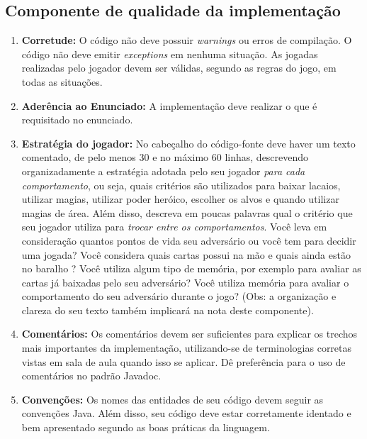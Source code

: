 \documentclass[10pt]{article}
\begin{document}
\subsection{Componente de qualidade da implementação} \label{ssec:componentes}

\begin{enumerate}
    \item \textbf{Corretude:} O código não deve possuir \textit{warnings} ou erros de compilação. O código não deve emitir \textit{exceptions} em nenhuma situação. As jogadas realizadas pelo jogador devem ser válidas, segundo as regras do jogo, em todas as situações.
    \item \textbf{Aderência ao Enunciado:} A implementação deve realizar o que é requisitado no enunciado.
    \item \textbf{Estratégia do jogador:} No cabeçalho do código-fonte deve haver um texto comentado, de pelo menos 30 e no máximo 60 linhas, descrevendo organizadamente a estratégia adotada pelo seu jogador \textit{para cada comportamento}, ou seja, quais critérios são utilizados para baixar lacaios, utilizar magias, utilizar poder heróico, escolher os alvos e quando utilizar magias de área. Além disso, descreva em poucas palavras qual o critério que seu jogador utiliza para \textit{trocar entre os comportamentos}. Você leva em consideração quantos pontos de vida seu adversário ou você tem para decidir uma jogada? Você considera quais cartas possui na mão e quais ainda estão no baralho ? Você utiliza algum tipo de memória, por exemplo para avaliar as cartas já baixadas pelo seu adversário? Você utiliza memória para avaliar o comportamento do seu adversário durante o jogo? (Obs: a organização e clareza do seu texto também implicará na nota deste componente).
    \item \textbf{Comentários:} Os comentários devem ser suficientes para explicar os trechos mais importantes da implementação, utilizando-se de terminologias corretas vistas em sala de aula quando isso se aplicar. Dê preferência para o uso de comentários no padrão Javadoc.
    \item \textbf{Convenções:} Os nomes das entidades de seu código devem seguir as convenções Java. Além disso, seu código deve estar corretamente identado e bem apresentado segundo as boas práticas da linguagem.
\end{enumerate}
\end{document}
